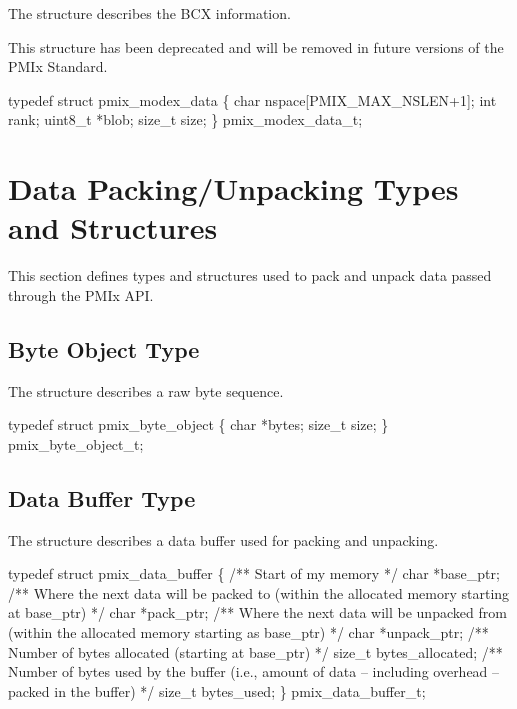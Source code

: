 The  structure describes the \ac{BCX} information.

\notestart
\noteheader
This structure has been deprecated and will be removed in future versions of the \ac{PMIx} Standard.
\noteend

\cspecificstart
\begin{codepar}
typedef struct pmix_modex_data \{
    char nspace[PMIX_MAX_NSLEN+1];
    int rank;
    uint8_t *blob;
    size_t size;
\} pmix_modex_data_t;
\end{codepar}
\cspecificend


\section{Data Packing/Unpacking Types and Structures}

This section defines types and structures used to pack and unpack data passed through the PMIx API.

\subsection{Byte Object Type}

The  structure describes a raw byte sequence.

\cspecificstart
\begin{codepar}
typedef struct pmix_byte_object \{
    char *bytes;
    size_t size;
\} pmix_byte_object_t;
\end{codepar}
\cspecificend


\subsection{Data Buffer Type}

The  structure describes a data buffer used for packing and unpacking.

\cspecificstart
\begin{codepar}
typedef struct pmix_data_buffer \{
    /** Start of my memory */
    char *base_ptr;
    /** Where the next data will be packed to (within the allocated
        memory starting at base_ptr) */
    char *pack_ptr;
    /** Where the next data will be unpacked from (within the
        allocated memory starting as base_ptr) */
    char *unpack_ptr;
    /** Number of bytes allocated (starting at base_ptr) */
    size_t bytes_allocated;
    /** Number of bytes used by the buffer (i.e., amount of data --
        including overhead -- packed in the buffer) */
    size_t bytes_used;
\} pmix_data_buffer_t;
\end{codepar}
\cspecificend



